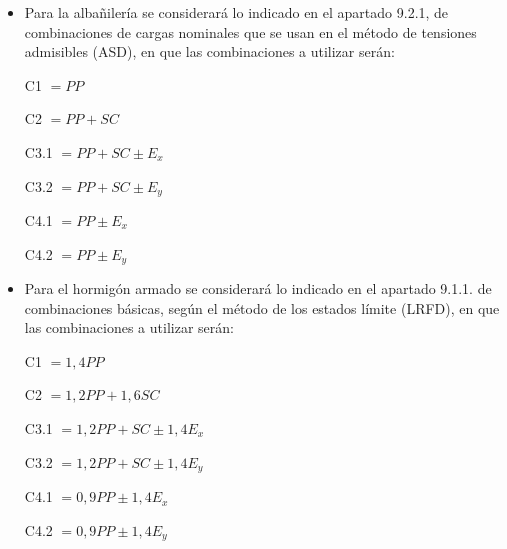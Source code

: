     \begin{itemize}
        \item Para la albañilería se considerará lo indicado en el apartado 9.2.1, de combinaciones de cargas nominales que se usan en el método de tensiones admisibles (ASD), en que las combinaciones a utilizar serán:
            
                \hspace{\caquita} C1          $=PP$
                
                \hspace{\caquita} C2          $=PP+SC$
                
                \hspace{\caquita} C3.1        $=PP+SC\pm E_x$
                
                \hspace{\caquita} C3.2        $=PP+SC\pm E_y$
                
                \hspace{\caquita} C4.1        $=PP\pm E_x$
                
                \hspace{\caquita} C4.2        $=PP\pm E_y$
        \item Para el hormigón armado se considerará lo indicado en el apartado 9.1.1. de combinaciones básicas, según el método de los estados límite (LRFD), en que las combinaciones a utilizar serán:
        
            \hspace{\caquita} C1          $=1,4PP$
    
            \hspace{\caquita} C2          $=1,2PP+1,6SC$
            
            \hspace{\caquita} C3.1        $=1,2PP+SC\pm1,4E_x$
            
            \hspace{\caquita} C3.2        $=1,2PP+SC\pm1,4E_y$
            
            \hspace{\caquita} C4.1        $=0,9PP\pm1,4E_x$
            
            \hspace{\caquita} C4.2        $=0,9PP\pm1,4E_y$
    
    \end{itemize}

